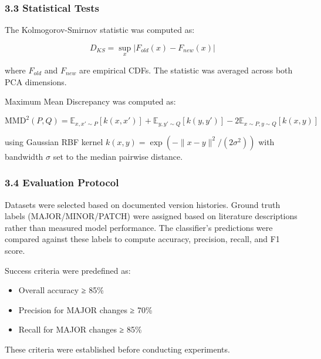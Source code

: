 \subsubsection{3.3 Statistical Tests}

The Kolmogorov-Smirnov statistic was computed as:

$$D_{KS} = \sup_x |F_{old}(x) - F_{new}(x)|$$

where $F_{old}$ and $F_{new}$ are empirical CDFs. The statistic was averaged across both PCA dimensions.

Maximum Mean Discrepancy was computed as:

$$\text{MMD}^2(P, Q) = \mathbb{E}_{x,x' \sim P}[k(x,x')] + \mathbb{E}_{y,y' \sim Q}[k(y,y')] - 2\mathbb{E}_{x \sim P, y \sim Q}[k(x,y)]$$

using Gaussian RBF kernel $k(x, y) = \exp(-\|x - y\|^2/(2\sigma^2))$ with bandwidth $\sigma$ set to the median pairwise distance.

\subsubsection{3.4 Evaluation Protocol}

Datasets were selected based on documented version histories. Ground truth labels (MAJOR/MINOR/PATCH) were assigned based on literature descriptions rather than measured model performance. The classifier's predictions were compared against these labels to compute accuracy, precision, recall, and F1 score.

Success criteria were predefined as:
\begin{itemize}
\item Overall accuracy ≥ 85\%
\item Precision for MAJOR changes ≥ 70\%
\item Recall for MAJOR changes ≥ 85\%
\end{itemize}

These criteria were established before conducting experiments.
